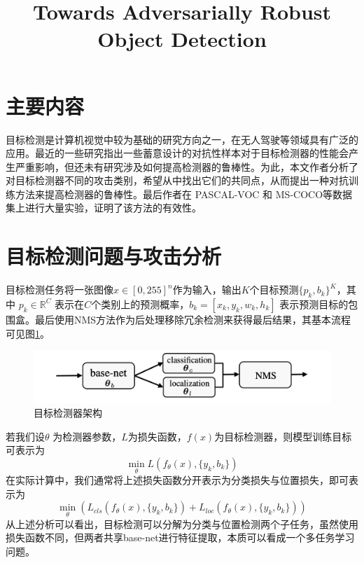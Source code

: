 \documentclass[conference,10pt]{IEEEtran}
\begin{document}
\title{Towards Adversarially Robust Object Detection}

\author{
	}
\maketitle

\section{主要内容}
目标检测是计算机视觉中较为基础的研究方向之一，在无人驾驶等领域具有广泛的应用。最近的一些研究指出一些蓄意设计的对抗性样本对于目标检测器的性能会产生严重影响，但还未有研究涉及如何提高检测器的鲁棒性。为此，本文作者分析了对目标检测器不同的攻击类别，希望从中找出它们的共同点，从而提出一种对抗训练方法来提高检测器的鲁棒性。最后作者在 PASCAL-VOC 和 MS-COCO等数据集上进行大量实验，证明了该方法的有效性。
\section{目标检测问题与攻击分析}
目标检测任务将一张图像$x\in[0,255]^n$作为输入，输出$K$个目标预测$\{p_k,b_k\}^K$，其中 $p_k\in\mathbb{R}^C$ 表示在$C$个类别上的预测概率，$b_k=[x_k,y_k,w_k,h_k]$ 表示预测目标的包围盒。最后使用NMS方法作为后处理移除冗余检测来获得最后结果，其基本流程可见图\ref{fig1}。
\begin{figure}[H]
	\centering
	\includegraphics[scale=0.3]{figure/fig1.png}
	\caption{目标检测器架构}
	\label{fig1}
\end{figure}

若我们设$\theta$ 为检测器参数，$L$为损失函数，$f(x)$为目标检测器，则模型训练目标可表示为
$$
\min\limits_\theta L(f_\theta(x),\{y_k,b_k\})
$$
在实际计算中，我们通常将上述损失函数分开表示为分类损失与位置损失，即可表示为
$$
\min\limits_\theta (L_{cls}(f_\theta(x),\{y_k,b_k\})+L_{loc}(f_\theta(x),\{y_k,b_k\}))
$$
从上述分析可以看出，目标检测可以分解为分类与位置检测两个子任务，虽然使用损失函数不同，但两者共享base-net进行特征提取，本质可以看成一个多任务学习问题。
\end{document}
